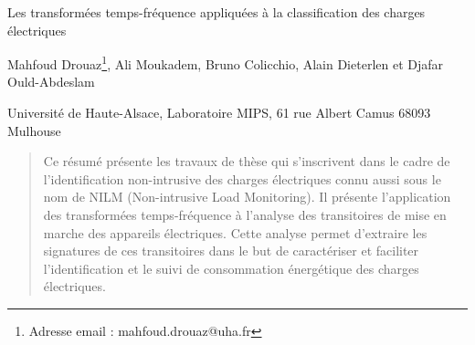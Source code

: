 \documentclass[12pt, a4paper]{article}
\begin{document}
\begin{center}
\large\sc 
\begin{flushleft}
    \bf
    {\begin{center}\large Les transformées temps-fréquence appliquées à la classification des charges électriques\end{center}}
\end{flushleft}

{\normalsize Mahfoud Drouaz\footnote{Adresse email : mahfoud.drouaz@uha.fr}, Ali Moukadem, Bruno Colicchio, Alain Dieterlen et Djafar Ould-Abdeslam}

{\normalsize Université de Haute-Alsace, Laboratoire MIPS, 61 rue Albert Camus 68093 Mulhouse}
\end{center}

\begin{abstract}
{\footnotesize Ce résumé présente les travaux de thèse qui s'inscrivent dans le cadre de l'identification non-intrusive des charges électriques connu aussi sous le nom de NILM (Non-intrusive Load Monitoring). Il présente l'application des transformées temps-fréquence à l'analyse des transitoires de mise en marche des appareils électriques. Cette analyse permet d'extraire les signatures de ces transitoires dans le but de caractériser et faciliter l'identification et le suivi de consommation énergétique des charges électriques.}
\end{abstract}
\end{document}
